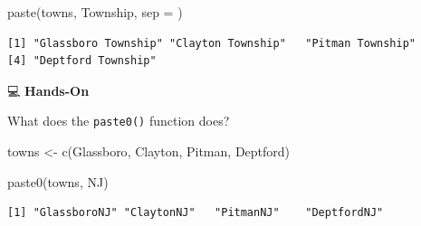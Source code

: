 \documentclass[
  letterpaper,
  DIV=11,
  numbers=noendperiod]{scrreprt}
\newenvironment{Shaded}{\begin{snugshade}}{\end{snugshade}}
\newcommand{\AttributeTok}[1]{\textcolor[rgb]{0.40,0.45,0.13}{#1}}
\newcommand{\FunctionTok}[1]{\textcolor[rgb]{0.28,0.35,0.67}{#1}}
\newcommand{\NormalTok}[1]{\textcolor[rgb]{0.00,0.23,0.31}{#1}}
\newcommand{\OtherTok}[1]{\textcolor[rgb]{0.00,0.23,0.31}{#1}}
\newcommand{\StringTok}[1]{\textcolor[rgb]{0.13,0.47,0.30}{#1}}
\begin{document}
\begin{tcolorbox}[enhanced jigsaw, colbacktitle=quarto-callout-tip-color!10!white, opacitybacktitle=0.6, breakable, left=2mm, leftrule=.75mm, toprule=.15mm, toptitle=1mm, bottomtitle=1mm, colframe=quarto-callout-tip-color-frame, opacityback=0, coltitle=black, arc=.35mm, titlerule=0mm, colback=white, bottomrule=.15mm, title=\textcolor{quarto-callout-tip-color}{\faLightbulb}\hspace{0.5em}{Answer}, rightrule=.15mm]

\begin{Shaded}
\begin{Highlighting}[]
\FunctionTok{paste}\NormalTok{(towns, }\StringTok{\textquotesingle{}Township\textquotesingle{}}\NormalTok{, }\AttributeTok{sep =} \StringTok{\textquotesingle{} \textquotesingle{}}\NormalTok{)}
\end{Highlighting}
\end{Shaded}

\begin{verbatim}
[1] "Glassboro Township" "Clayton Township"   "Pitman Township"   
[4] "Deptford Township" 
\end{verbatim}

\end{tcolorbox}

💻 \textbf{Hands-On}

What does the \texttt{paste0()} function does?

\begin{Shaded}
\begin{Highlighting}[]
\NormalTok{towns }\OtherTok{\textless{}{-}} \FunctionTok{c}\NormalTok{(}\StringTok{\textquotesingle{}Glassboro\textquotesingle{}}\NormalTok{, }\StringTok{\textquotesingle{}Clayton\textquotesingle{}}\NormalTok{, }\StringTok{\textquotesingle{}Pitman\textquotesingle{}}\NormalTok{, }\StringTok{\textquotesingle{}Deptford\textquotesingle{}}\NormalTok{)}

\FunctionTok{paste0}\NormalTok{(towns, }\StringTok{\textquotesingle{}NJ\textquotesingle{}}\NormalTok{)}
\end{Highlighting}
\end{Shaded}

\begin{verbatim}
[1] "GlassboroNJ" "ClaytonNJ"   "PitmanNJ"    "DeptfordNJ" 
\end{verbatim}
\end{document}
